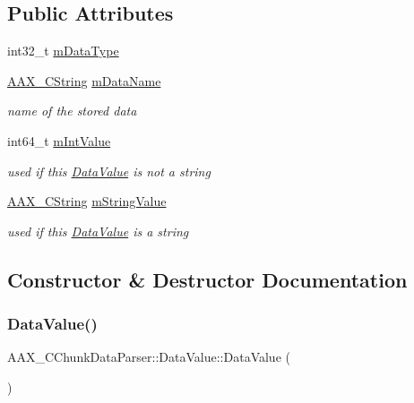 \subsection*{Public Attributes}
\begin{DoxyCompactItemize}
\item 
int32\+\_\+t \mbox{\hyperlink{a01465_a38d8fad1f04efb4e332b77f1e008cccf}{m\+Data\+Type}}
\item 
\mbox{\hyperlink{a01573}{A\+A\+X\+\_\+\+C\+String}} \mbox{\hyperlink{a01465_a42eaa203593c95fc334e62bda6d7cee0}{m\+Data\+Name}}
\begin{DoxyCompactList}\small\item\em name of the stored data \end{DoxyCompactList}\item 
int64\+\_\+t \mbox{\hyperlink{a01465_ac72bf24dfa01f0947d4047979f56cede}{m\+Int\+Value}}
\begin{DoxyCompactList}\small\item\em used if this \mbox{\hyperlink{a01465}{Data\+Value}} is not a string \end{DoxyCompactList}\item 
\mbox{\hyperlink{a01573}{A\+A\+X\+\_\+\+C\+String}} \mbox{\hyperlink{a01465_a339c73c9bc16e4c4765911f4f0072814}{m\+String\+Value}}
\begin{DoxyCompactList}\small\item\em used if this \mbox{\hyperlink{a01465}{Data\+Value}} is a string \end{DoxyCompactList}\end{DoxyCompactItemize}


\subsection{Constructor \& Destructor Documentation}
\mbox{\label{a01465_a987366216b93c23f40b8b040412ee2dd}} 
\subsubsection{\texorpdfstring{DataValue()}{DataValue()}}
{\footnotesize\ttfamily A\+A\+X\+\_\+\+C\+Chunk\+Data\+Parser\+::\+Data\+Value\+::\+Data\+Value (\begin{DoxyParamCaption}{ }\end{DoxyParamCaption})\hspace{0.3cm}{\ttfamily [inline]}}




